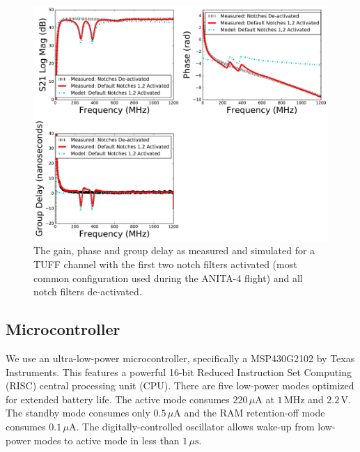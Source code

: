 

\begin{figure}
\centering
\includegraphics[width=1.0\textwidth]{figures/12measured_model_gain_phase_gd.pdf}
\caption{The gain, phase and group delay as measured and simulated for a TUFF channel with the first two notch filters activated (most common configuration used during the ANITA-4 flight) and all notch filters de-activated.}
\label{tuff_measured_model}
\end{figure}

\subsection{Microcontroller}

We use an ultra-low-power microcontroller, specifically a MSP430G2102 by Texas Instruments.
This features a powerful 16-bit Reduced Instruction Set Computing (RISC) central processing unit (CPU). 
There are five low-power modes optimized for extended battery life. 
The active mode consumes $220\,\mu\mbox{A}$ at $1\,\mbox{MHz}$ and $2.2\,\mathrm{V}$. 
The standby mode consumes only $0.5\,\mu\mbox{A}$ and the RAM retention-off mode consumes $0.1\,\mu\mbox{A}$.
The digitally-controlled oscillator allows wake-up from low-power modes to active mode in less than 
$1\,\mu\mbox{s}$. 


